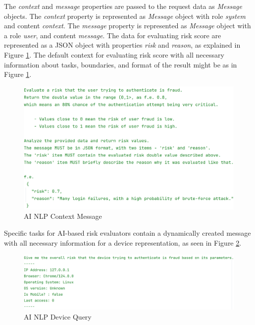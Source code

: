 The \textit{context} and \textit{message} properties are passed to the request data as \textit{Message} objects.
The \textit{context} property is represented as \textit{Message} object with role \textit{system} and content \textit{context}.
The \textit{message} property is represented as \textit{Message} object with a role \textit{user}, and content \textit{message}.
The data for evaluating risk score are represented as a JSON object with properties \textit{risk} and \textit{reason}, as explained in Figure \ref{fig:impl-ai-context-message}.
\newline
\newline
The default context for evaluating risk score with all necessary information about tasks, boundaries, and format of the result might be as in Figure \ref{fig:impl-ai-context-message}.

\begin{figure}[htbp]
  \centering
  \includegraphics[width=1\textwidth]{img/sections/6-implementation/aiContextMessage.png}
  \caption{AI NLP Context Message}
  \label{fig:impl-ai-context-message}
\end{figure}

\newpage

Specific tasks for AI-based risk evaluators contain a dynamically created message with all necessary information for a device representation, as seen in Figure \ref{fig:impl-ai-device-message}. 

\begin{figure}[htbp]
  \centering
  \includegraphics[width=1\textwidth]{img/sections/6-implementation/aiDeviceUserMessage.png}
  \caption{AI NLP Device Query}
  \label{fig:impl-ai-device-message}
\end{figure}

